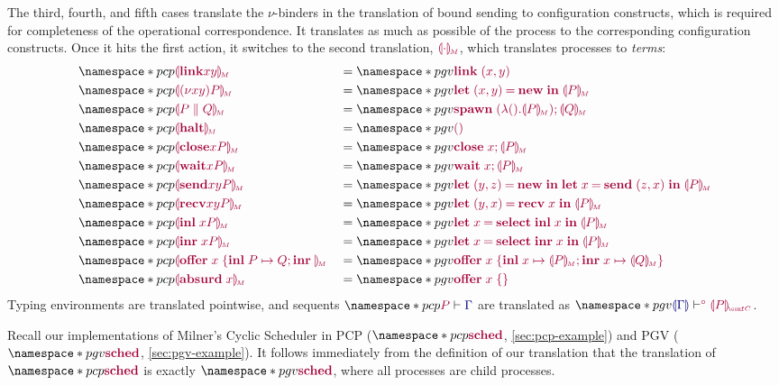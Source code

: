 \documentclass[main.tex]{subfiles}
\begin{document}
The third, fourth, and fifth cases translate the $\nu$-binders in the translation of bound sending to configuration constructs, which is required for completeness of the operational correspondence.
It translates as much as possible of the process to the corresponding configuration constructs. Once it hits the first action, it switches to the second translation, $\tm{\cpgvM{\cdot}}$, which translates processes to \emph{terms}:
\begin{align*}
  &\pcp{\tm{\cpgvM{\link{x}{y}}}}
  &&= \pgv{\tm{\link\;{\pair{x}{y}}}} \\
  &\pcp{\tm{\cpgvM{\res{x}{y}{P}}}}
  &&= \pgv{\tm{\letpair{x}{y}{\new}{\cpgvM{P}}}} \\
  &\pcp{\tm{\cpgvM{\ppar{P}{Q}}}}
  &&= \pgv{\tm{\andthen{\spawn\;{(\lambda\unit.\cpgvM{P})}}{\cpgvM{Q}}}} \\
  &\pcp{\tm{\cpgvM{\halt}}}
  &&= \pgv{\tm{\unit}} \\
  &\pcp{\tm{\cpgvM{\close{x}{P}}}}
  &&= \pgv{\tm{\andthen{\close\;{x}}{\cpgvM{P}}}} \\
  &\pcp{\tm{\cpgvM{\wait{x}{P}}}}
  &&= \pgv{\tm{\andthen{\wait\;{x}}{\cpgvM{P}}}} \\
  &\pcp{\tm{\cpgvM{\send{x}{y}{P}}}}
  &&= \pgv{\tm{\letpair{y}{z}{\new}{\letbind{x}{\send\;{\pair{z}{x}}}{\cpgvM{P}}}}} \\
  &\pcp{\tm{\cpgvM{\recv{x}{y}{P}}}}
  &&= \pgv{\tm{\letpair{y}{x}{\recv\;{x}}{\cpgvM{P}}}} \\
  &\pcp{\tm{\cpgvM{\inl{x}{P}}}}
  &&= \pgv{\tm{\letbind{x}{\select{\labinl}\;{x}}{\cpgvM{P}}}} \\
  &\pcp{\tm{\cpgvM{\inr{x}{P}}}}
  &&= \pgv{\tm{\letbind{x}{\select{\labinr}\;{x}}{\cpgvM{P}}}} \\
  &\pcp{\tm{\cpgvM{\offer{x}{P}{Q}}}}
  &&= \pgv{\tm{\offer{x}{x}{\cpgvM{P}}{x}{\cpgvM{Q}}}} \\
  &\pcp{\tm{\cpgvM{\absurd{x}}}}
  &&= \pgv{\tm{\offeremp{x}}}
\end{align*}
Typing environments are translated pointwise, and sequents $\pcp{\seq{P}{\ty{\Gamma}}}$ are translated as $\pgv{\cseq[\child]{\ty{\cpgvT{\ty{\Gamma}}}}{\cpgvC{P}}}$.

Recall our implementations of Milner's Cyclic Scheduler in PCP ($\pcp{\tm{\sched}}$, \cref{sec:pcp-example}) and PGV ($\pgv{\tm{\sched}}$, \cref{sec:pgv-example}). It follows immediately from the definition of our translation that the translation of $\pcp{\tm{\sched}}$ is exactly $\pgv{\tm{\sched}}$, where all processes are child processes.
\end{document}
